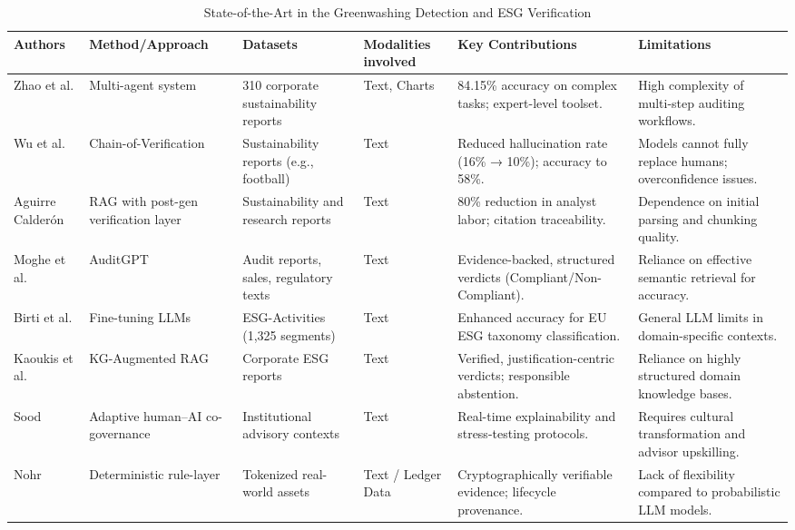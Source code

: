 \documentclass[english, online, cse, master]{dithesis}
\begin{document}
\begin{landscape}
\begin{table}[p]
\centering
\caption{State-of-the-Art in the Greenwashing Detection and ESG Verification}
\label{tab:greenwashing-detection-esg-verification}
\small
\renewcommand{\arraystretch}{1.2}
\begin{tabularx}{\linewidth}{|p{1.8cm}|X|X|p{1.8cm}|X|X|}
\hline
Authors & Method/Approach & Datasets & Modalities involved & Key Contributions & Limitations \\ \hline
Zhao et al.  \parencite{yilei_zhao_b7bbd9c8} & Multi-agent system & 310 corporate sustainability reports & Text, Charts & 84.15\% accuracy on complex tasks; expert-level toolset. & High complexity of multi-step auditing workflows. \\ \hline
Wu et al.  \parencite{yue_wu_cae353aa} & Chain-of-Verification & Sustainability reports (e.g., football) & Text & Reduced hallucination rate (16\% → 10\%); accuracy to 58\%. & Models cannot fully replace humans; overconfidence issues. \\ \hline
Aguirre Calderón  \parencite{juan_aguirre_calder_n_5eae82e0} & RAG with post-gen verification layer & Sustainability and research reports & Text & 80\% reduction in analyst labor; citation traceability. & Dependence on initial parsing and chunking quality. \\ \hline
Moghe et al.  \parencite{abhijeet_b__moghe_963e6c96} & AuditGPT & Audit reports, sales, regulatory texts & Text & Evidence-backed, structured verdicts (Compliant/Non-Compliant). & Reliance on effective semantic retrieval for accuracy. \\ \hline
Birti et al.  \parencite{mattia_birti_c097e3e8} & Fine-tuning LLMs & ESG-Activities (1,325 segments) & Text & Enhanced accuracy for EU ESG taxonomy classification. & General LLM limits in domain-specific contexts. \\ \hline
Kaoukis et al.  \parencite{kaoukis__georgios_35bab107} & KG-Augmented RAG & Corporate ESG reports & Text & Verified, justification-centric verdicts; responsible abstention. & Reliance on highly structured domain knowledge bases. \\ \hline
Sood  \parencite{rohit_sood_cb3a4ead} & Adaptive human–AI co-governance & Institutional advisory contexts & Text & Real-time explainability and stress-testing protocols. & Requires cultural transformation and advisor upskilling. \\ \hline
Nohr  \parencite{steven_paul_nohr_a6874924} & Deterministic rule-layer & Tokenized real-world assets & Text / Ledger Data & Cryptographically verifiable evidence; lifecycle provenance. & Lack of flexibility compared to probabilistic LLM models. \\ \hline

\end{tabularx}
\end{table}
\end{landscape}
\end{document}
